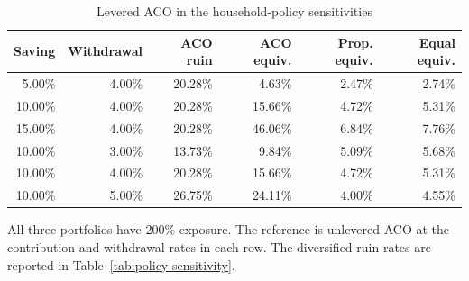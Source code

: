\begin{table}[H]
\centering\small
\caption{Levered ACO in the household-policy sensitivities}\label{tab:aco-policy}
\begin{tabular}{rrrrrr}\toprule
Saving & Withdrawal & ACO ruin & ACO equiv. & Prop. equiv. & Equal equiv. \\
\midrule
5.00\% & 4.00\% & 20.28\% & 4.63\% & 2.47\% & 2.74\% \\
10.00\% & 4.00\% & 20.28\% & 15.66\% & 4.72\% & 5.31\% \\
15.00\% & 4.00\% & 20.28\% & 46.06\% & 6.84\% & 7.76\% \\
10.00\% & 3.00\% & 13.73\% & 9.84\% & 5.09\% & 5.68\% \\
10.00\% & 4.00\% & 20.28\% & 15.66\% & 4.72\% & 5.31\% \\
10.00\% & 5.00\% & 26.75\% & 24.11\% & 4.00\% & 4.55\% \\
\bottomrule\end{tabular}
\par\smallskip\begin{minipage}{0.96\textwidth}\footnotesize
All three portfolios have 200\% exposure. The reference is unlevered ACO at the contribution and withdrawal rates in each row. The diversified ruin rates are reported in Table~\ref{tab:policy-sensitivity}.
\end{minipage}\end{table}
